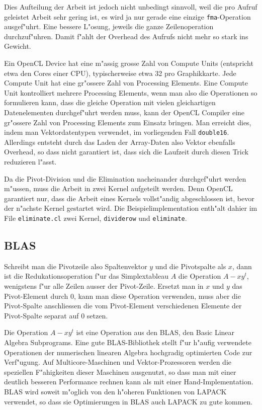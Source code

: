 Dies Aufteilung der Arbeit ist jedoch nicht unbedingt sinnvoll,
weil die pro Aufruf geleistet Arbeit sehr gering ist, es wird ja nur
gerade eine einzige {\tt fma}-Operation ausgef"uhrt.
Eine bessere L"osung, jeweils die ganze Zeilenoperation durchzuf"uhren.
Damit f"ahlt der Overhead des Aufrufs nicht mehr so stark ins Gewicht.

Ein OpenCL Device hat eine m"assig grosse Zahl von Compute Units (entspricht
etwa den Cores einer CPU), typischerweise etwa 32 pro Graphikkarte. Jede
Compute Unit hat eine gr"ossere Zahl von Processing Elements. Eine Compute
Unit kontrolliert mehrere Processing Elements, wenn man also die
Operationen so formulieren kann, dass die gleiche Operation mit vielen
gleichartigen Datenelementen durchgef"uhrt werden muss, kann der
OpenCL Compiler eine gr"ossere Zahl von Processing Elements zum Einsatz
bringen. Man erreicht dies, indem man Vektordatentypen verwendet, 
im vorliegenden Fall {\tt double16}. Allerdings entsteht durch das 
Laden der Array-Daten also Vektor ebenfalls Overhead, so dass nicht
garantiert ist, dass sich die Laufzeit durch diesen Trick reduzieren
l"asst.

Da die Pivot-Division und die Elimination nacheinander durchgef"uhrt
werden m"ussen, muss die Arbeit in zwei Kernel aufgeteilt werden.
Denn OpenCL garantiert nur, dass die Arbeit eines Kernels vollst"andig
abgeschlossen ist, bevor der n"achste Kernel gestartet wird.
Die Beispielimplementation enth"alt dahier im File \verb+eliminate.cl+
zwei Kernel, {\tt dividerow} und {\tt eliminate}.

\subsection{BLAS}
Schreibt man die Pivotzeile also Spaltenvektor $y$ und
die Pivotspalte als $x$, dann ist die Redukationsoperation
f"ur das Simplextableau $A$ die Operation
$ A-xy^t $, wenigstens f"ur alle Zeilen ausser der Pivot-Zeile.
Ersetzt man in $x$ und $y$ das Pivot-Element durch $0$, kann man diese 
Operation verwenden, muss aber die Pivot-Spalte anschliessen die
vom Pivot-Element verschiedenen Elemente der Pivot-Spalte separat
auf $0$ setzen.

Die Operation $A-xy^t$ ist eine Operation aus den BLAS, den
Basic Linear Algebra Subprograms.
Eine gute BLAS-Bibliothek stellt f"ur h"aufig verwendete Operationen
der numerischen linearen Algebra hochgradig optimierten Code 
zur Verf"ugung.
Auf Multicore-Maschinen und Vektor-Prozessoren werden die speziellen
F"ahigkeiten dieser Maschinen ausgenutzt, so dass man mit einer
deutlich
besseren Performance rechnen kann als mit einer Hand-Implementation.
BLAS wird soweit m"oglich von den h"oheren Funktionen von LAPACK verwendet,
so dass sie Optimierungen in BLAS auch LAPACK zu gute kommen. 

